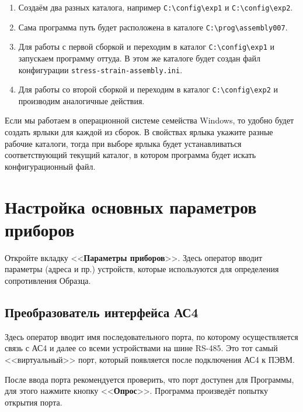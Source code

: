 \documentclass[12pt, a4paper, twocolumn]{book}
\newcommand{\PROGNAME}{stress-strain-assembly}
\newcommand{\CTL}[1]{<<{\bf #1}>>}
\newcommand{\FILENAME}[1]{{\tt #1}}
\begin{document}
\begin{enumerate}
\item Создаём два разных каталога, например \FILENAME{C:\textbackslash{}config\textbackslash{}exp1} и \FILENAME{C:\textbackslash{}config\textbackslash{}exp2}.

\item Сама программа путь будет расположена в каталоге \FILENAME{C:\textbackslash{}prog\textbackslash{}assembly007}.

\item Для работы с первой сборкой и переходим в каталог \FILENAME{C:\textbackslash{}config\textbackslash{}exp1} и запускаем программу оттуда. В этом же каталоге будет создан файл конфигурации \FILENAME{\PROGNAME{}.ini}.

\item Для работы со второй сборкой и переходим в каталог \FILENAME{C:\textbackslash{}config\textbackslash{}exp2} и производим аналогичные действия.

\end{enumerate}

Если мы работаем в операционной системе семейства Windows, то удобно будет создать ярлыки для каждой из сборок. В свойствах ярлыка укажите разные рабочие каталоги, тогда при выборе ярлыка будет устанавливаться соответствующий текущий каталог, в котором программа будет искать конфигурационный файл.

\section{Настройка основных параметров приборов}

Откройте вкладку \CTL{Параметры приборов}. Здесь оператор вводит параметры (адреса и пр.) устройств, которые используются для определения сопротивления Образца.

\subsection{Преобразователь интерфейса АС4}

Здесь оператор вводит имя последовательного порта, по которому осуществляется связь с АС4 и далее со всеми устройствами на шине RS-485. Это тот самый <<виртуальный>> порт, который появляется после подключения АС4 к ПЭВМ.

После ввода порта рекомендуется проверить, что порт доступен для Программы, для этого нажмите кнопку \CTL{Опрос}. Программа произведёт попытку открытия порта.
\end{document}
